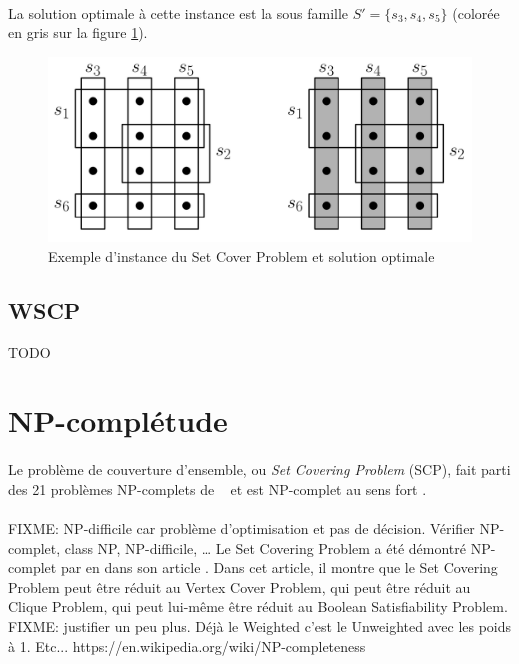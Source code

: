 \documentclass[12pt,letterpaper,twoside]{article}
\begin{document}
			\paragraph*{}
				La solution optimale à cette instance est la sous famille \(S'=\{s_3, s_4, s_5\}\) (colorée en gris sur la figure \ref{fig:example}).
			\begin{figure}[H]
				\centering%
				\includegraphics[width=0.65\linewidth]{figures/example}%
				\caption{Exemple d'instance du Set Cover Problem et solution optimale\cite{Mount2017}}%
				\label{fig:example}%
			\end{figure}
		\subsection{WSCP}
			TODO
	\section{NP-complétude}
		\paragraph*{}
			Le problème de couverture d'ensemble, ou \emph{Set Covering Problem} (SCP),
			fait parti des 21 problèmes NP-complets de \citeauthor{Karp1972}~\cite{Karp1972}
			et est NP-complet au sens fort \cite{garey2002computers}.
		\paragraph*{}
			FIXME: NP-difficile car problème d'optimisation et pas de décision. Vérifier NP-complet, class NP, NP-difficile, …
			Le Set Covering Problem a été démontré NP-complet par \citeauthor{Karp1972} en \citeyear{Karp1972} dans son article \cite{Karp1972}. Dans cet article, il montre que le Set Covering Problem peut être réduit au Vertex Cover Problem, qui peut être réduit au Clique Problem, qui peut lui-même être réduit au Boolean Satisfiability Problem.
			FIXME: justifier un peu plus. Déjà le Weighted c'est le Unweighted avec les poids à 1. Etc...
			https://en.wikipedia.org/wiki/NP-completeness
\end{document}
